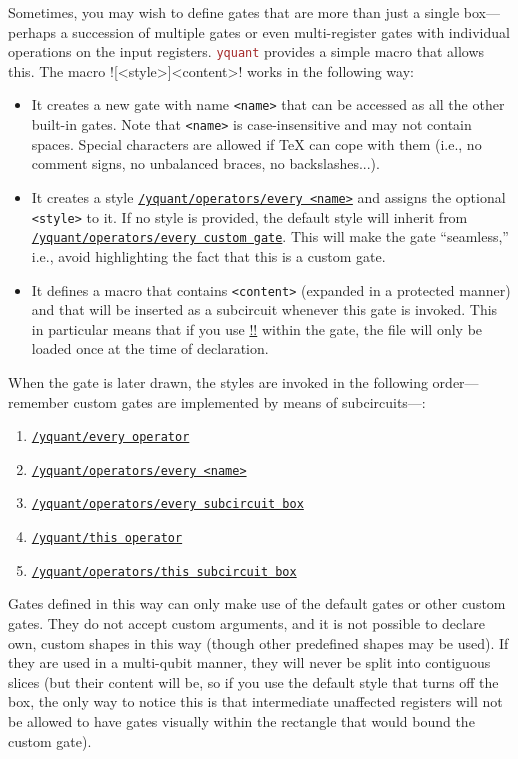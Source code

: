 \documentclass{scrartcl}
\def\pkg#1{\textcolor{brown}{\texttt{#1}}}
\def\style#1{\hyperref[style:#1]{\texttt{#1}}}
\def\Yquant{\pkg{yquant}}
\begin{document}
         Sometimes, you may wish to define gates that are more than just a single box---perhaps a succession of multiple gates or even multi\hyp register gates with individual operations on the input registers.
         \Yquant{} provides a simple macro that allows this.
         The macro \tex![<style>]{<content>}! works in the following way:
         \begin{itemize}
            \item It creates a new gate with name \texttt{<name>} that can be accessed as all the other built\hyp in gates.
               Note that \texttt{<name>} is case\hyp insensitive and may not contain spaces.
               Special characters are allowed if \TeX{} can cope with them (i.e., no comment signs, no unbalanced braces, no backslashes...).
            \item It creates a style \style{/yquant/operators/every <name>} and assigns the optional \texttt{<style>} to it.
               If no style is provided, the default style will inherit from \style{/yquant/operators/every custom gate}.
               This will make the gate ``seamless,'' i.e., avoid highlighting the fact that this is a custom gate.
            \item It defines a macro that contains \texttt{<content>} (expanded in a protected manner) and that will be inserted as a subcircuit whenever this gate is invoked.
               This in particular means that if you use \hyperref[sec:import]{\tex!\yquantimport!} within the gate, the file will only be loaded once at the time of declaration.
         \end{itemize}
         When the gate is later drawn, the styles are invoked in the following order---remember custom gates are implemented by means of subcircuits---:
         \begin{enumerate}
            \item \style{/yquant/every operator}
            \item \style{/yquant/operators/every <name>}
            \item \style{/yquant/operators/every subcircuit box}
            \item \style{/yquant/this operator}
            \item \style{/yquant/operators/this subcircuit box}
         \end{enumerate}
         Gates defined in this way can only make use of the default gates or other custom gates.
         They do not accept custom arguments, and it is not possible to declare own, custom shapes in this way (though other predefined shapes may be used).
         If they are used in a multi\hyp qubit manner, they will never be split into contiguous slices (but their content will be, so if you use the default style that turns off the box, the only way to notice this is that intermediate unaffected registers will not be allowed to have gates visually within the rectangle that would bound the custom gate).
\end{document}
